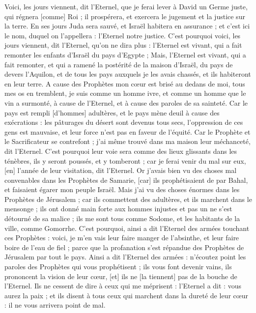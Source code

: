 \begin{multicols}{2}
Voici, les jours viennent, dit l'Eternel, que je ferai lever à David un Germe juste, qui régnera [comme] Roi ; il prospérera, et exercera le jugement et la justice sur la terre.
En ses jours Juda sera sauvé, et Israël habitera en assurance ; et c'est ici le nom, duquel on l'appellera : l'Eternel notre justice.
C'est pourquoi voici, les jours viennent, dit l'Eternel, qu'on ne dira plus : l'Eternel est vivant, qui a fait remonter les enfants d'Israël du pays d'Egypte ;
Mais, l'Eternel est vivant, qui a fait remonter, et qui a ramené la postérité de la maison d'Israël, du pays de devers l'Aquilon, et de tous les pays auxquels je les avais chassés, et ils habiteront en leur terre.
A cause des Prophètes mon cœur est brisé au dedans de moi, tous mes os en tremblent, je suis comme un homme ivre, et comme un homme que le vin a surmonté, à cause de l'Eternel, et à cause des paroles de sa sainteté.
Car le pays est rempli [d'hommes] adultères, et le pays mène deuil à cause des exécrations : les pâturages du désert sont devenus tous secs, l'oppression de ces gens est mauvaise, et leur force n'est pas en faveur de l'équité.
Car le Prophète et le Sacrificateur se contrefont ; j'ai même trouvé dans ma maison leur méchanceté, dit l'Eternel.
C'est pourquoi leur voie sera comme des lieux glissants dans les ténèbres, ils y seront poussés, et y tomberont ; car je ferai venir du mal sur eux, [en] l'année de leur visitation, dit l'Eternel.
Or j'avais bien vu des choses mal convenables dans les Prophètes de Samarie, [car] ils prophétisaient de par Bahal, et faisaient égarer mon peuple Israël.
Mais j'ai vu des choses énormes dans les Prophètes de Jérusalem ; car ils commettent des adultères, et ils marchent dans le mensonge ; ils ont donné main forte aux hommes injustes et pas un ne s'est détourné de sa malice ; ils me sont tous comme Sodome, et les habitants de la ville, comme Gomorrhe.
C'est pourquoi, ainsi a dit l'Eternel des armées touchant ces Prophètes : voici, je m'en vais leur faire manger de l'absinthe, et leur faire boire de l'eau de fiel ; parce que la profanation s'est répandue des Prophètes de Jérusalem par tout le pays.
Ainsi a dit l'Eternel des armées : n'écoutez point les paroles des Prophètes qui vous prophétisent ; ils vous font devenir vains, ils prononcent la vision de leur cœur, [et] ils ne [la tiennent] pas de la bouche de l'Eternel.
Ils ne cessent de dire à ceux qui me méprisent : l'Eternel a dit : vous aurez la paix ; et ils disent à tous ceux qui marchent dans la dureté de leur cœur : il ne vous arrivera point de mal.

\end{multicols}
